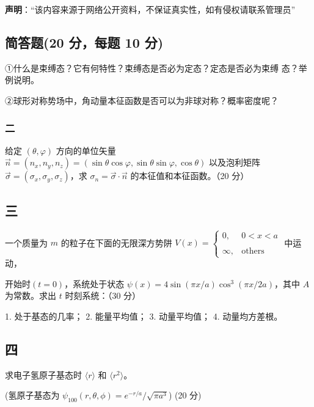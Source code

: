 
\textbf{声明}：“该内容来源于网络公开资料，不保证真实性，如有侵权请联系管理员”

\subsection{简答题(20 分，每题 10 分)}
①什么是束缚态？它有何特性？束缚态是否必为定态？定态是否必为束缚
态？举例说明。

②球形对称势场中，角动量本征函数是否可以为非球对称？概率密度呢？

\subsubsection{二}
 给定 $\left( \theta, \varphi \right)$ 方向的单位矢量 $\vec{n} = \left( n_x, n_y, n_z \right) = \left( \sin \theta \cos \varphi, \sin \theta \sin \varphi, \cos \theta \right)$ 以及泡利矩阵 $\vec{\sigma} = \left( \sigma_x, \sigma_y, \sigma_z \right)$，求 $\sigma_n = \vec{\sigma} \cdot \vec{n}$ 的本征值和本征函数。（20 分）

\subsection{三}
一个质量为 $m$ 的粒子在下面的无限深方势阱 $V(x) = 
\begin{cases} 
0, & 0 < x < a \\\\ 
\infty, & \text{others} 
\end{cases}$ 中运动，

开始时$(t=0)$，系统处于状态 $\psi(x) = 4\sin(\pi x/a)\cos^3(\pi x/2a)$，其中 $A$ 为常数。求出 $t$ 时刻系统：（30 分）

1. 处于基态的几率；
2. 能量平均值；
3. 动量平均值；
4. 动量均方差根。

\subsection{四}
求电子氢原子基态时 $\langle r \rangle$ 和 $ \langle r^2 \rangle$。

(氢原子基态为 $\psi_{100}(r, \theta, \phi) = e^{-r/a}/{\sqrt{\pi a^3}} $) (20 分)
